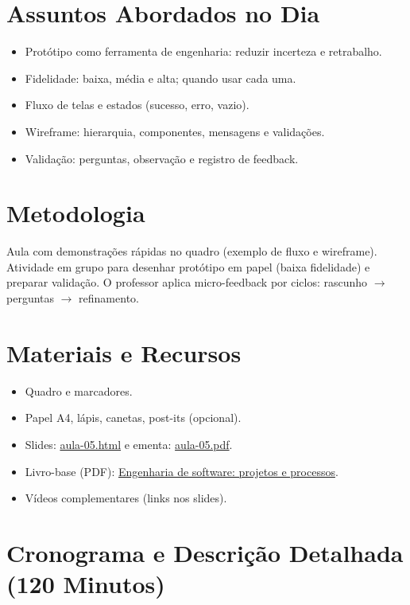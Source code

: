 \documentclass[12pt,a4paper]{article}
\begin{document}
\section{Assuntos Abordados no Dia}
\begin{itemize}[leftmargin=*,itemsep=0.25em]
  \item Protótipo como ferramenta de engenharia: reduzir incerteza e retrabalho.
  \item Fidelidade: baixa, média e alta; quando usar cada uma.
  \item Fluxo de telas e estados (sucesso, erro, vazio).
  \item Wireframe: hierarquia, componentes, mensagens e validações.
  \item Validação: perguntas, observação e registro de feedback.
\end{itemize}

\section{Metodologia}
Aula com demonstrações rápidas no quadro (exemplo de fluxo e wireframe). Atividade em grupo para desenhar protótipo em papel (baixa fidelidade) e preparar validação. O professor aplica micro-feedback por ciclos: rascunho $\rightarrow$ perguntas $\rightarrow$ refinamento.

\section{Materiais e Recursos}
\begin{itemize}[leftmargin=*,itemsep=0.25em]
  \item Quadro e marcadores.
  \item Papel A4, lápis, canetas, post-its (opcional).
  \item Slides: \href{aula-05.html}{aula-05.html} e ementa: \href{aula-05.pdf}{aula-05.pdf}.
  \item Livro-base (PDF): \href{../99-Materiais/Engenharia%20de%20software%20projetos%20e%20processos%20by%20Wilson%20de%20P%C3%A1dua%20Paula%20Filho%20.epub.pdf}{Engenharia de software: projetos e processos}.
  \item Vídeos complementares (links nos slides).
\end{itemize}

\section{Cronograma e Descrição Detalhada (120 Minutos)}
\end{document}
